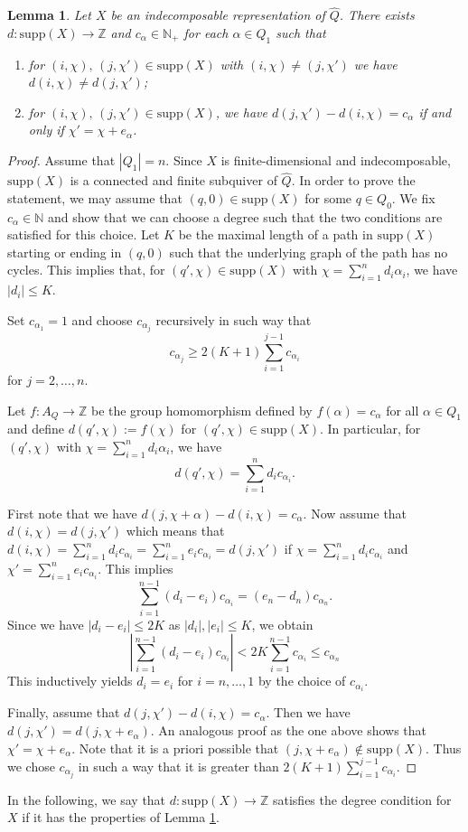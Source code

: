 \documentclass{amsart}
\newtheorem{lemma}[theorem]{Lemma}
\newcommand{\ZZ}{\mathbb{Z}}
\newcommand{\NN}{\mathbb{N}}
\begin{document}
\begin{lemma}
  \label{degreecondition} 
  Let $X$ be an indecomposable representation of $\hat Q$. There exists $d:\mathrm{supp} (X)\to\ZZ$ and $c_\alpha\in\mathbb N_+$ for each $\alpha\in Q_1$ such that
	\begin{enumerate}
	\item for $(i,\chi),\,(j,\chi')\in\mathrm{supp}(X)$ with $(i,\chi)\neq (j,\chi')$ we have $d(i,\chi)\ne d(j,\chi')$;
	\item for $(i,\chi),\,(j,\chi')\in\mathrm{supp}(X)$, we have $d(j,\chi')-d(i,\chi)=c_\alpha$ if and only if $\chi'=\chi+e_\alpha$.
	\end{enumerate}
\end{lemma}
\begin{proof}Assume that $|Q_1|=n$. Since $X$ is finite-dimensional and indecomposable, $\mathrm{supp}( X)$ is a connected and finite subquiver of $\hat Q$. In order to prove the statement, we may assume that $(q,0)\in \mathrm{supp}(X)$ for some $q\in Q_0$. We fix $c_\alpha\in\NN$ and show that we can choose a degree such that the two conditions are satisfied for this choice. Let $K$ be the maximal length of a path in $\mathrm{supp}(X)$ starting or ending in $(q,0)$ such that the underlying graph of the path has no cycles. This implies that, for $(q',\chi)\in\mathrm{supp}(X)$ with $\chi=\sum_{i=1}^nd_i\alpha_i$, we have $|d_i|\leq K$.

Set $c_{\alpha_1}=1$ and choose $c_{\alpha_j}$ recursively in such way that 
\[c_{\alpha_j}\geq 2(K+1)\sum_{i=1}^{j-1}c_{\alpha_i}\]
for $j=2,\ldots,n$.  

Let $f:A_Q\to \ZZ$ be the group homomorphism defined by $f(\alpha)=c_\alpha$ for all $\alpha\in Q_1$ and define $d(q',\chi):=f(\chi)$ for $(q',\chi)\in\mathrm{supp}(X)$. In particular, for $(q',\chi)$ with $\chi=\sum_{i=1}^nd_i\alpha_i$, we have
\[d(q',\chi)=\sum_{i=1}^nd_ic_{\alpha_i}.\]



First note that we have $d(j,\chi+\alpha)-d(i,\chi)=c_\alpha$. Now assume that $d(i,\chi)=d(j,\chi')$ which means that $d(i,\chi)=\sum_{i=1}^{n}d_ic_{\alpha_i}=\sum_{i=1}^{n}e_ic_{\alpha_i}=d(j,\chi')$ if $\chi=\sum_{i=1}^{n}d_ic_{\alpha_i}$ and $\chi'=\sum_{i=1}^{n}e_ic_{\alpha_i}$. This implies
\[\sum_{i=1}^{n-1}(d_i-e_i)c_{\alpha_i}=(e_{n}-d_{n})c_{\alpha_{n}}.\]
Since we have $|d_i-e_i|\leq 2K$ as $|d_i|,|e_i|\leq K$, we obtain $$|\sum_{i=1}^{n-1}(d_i-e_i)c_{\alpha_i}|<2K\sum_{i=1}^{n-1}c_{\alpha_i}\leq c_{\alpha_n}$$
This inductively yields $d_i=e_i$ for $i=n,\ldots,1$ by the choice of $c_{\alpha_{i}}$. 

Finally, assume that $d(j,\chi')-d(i,\chi)=c_\alpha$. Then we have $d(j,\chi')=d(j,\chi+e_\alpha)$. An analogous proof as the one above shows that $\chi'=\chi+e_\alpha$. Note that it is a priori possible that $(j,\chi+e_\alpha)\notin\mathrm{supp}(X)$. Thus we chose $c_{\alpha_j}$ in such a way that it is greater than $2(K+1)\sum_{i=1}^{j-1}c_{\alpha_i}$. 

\end{proof}
In the following, we say that $d:\mathrm{supp}(X)\to\ZZ$ satisfies the degree condition for $X$ if it has the properties of Lemma \ref{degreecondition}.
\end{document}
